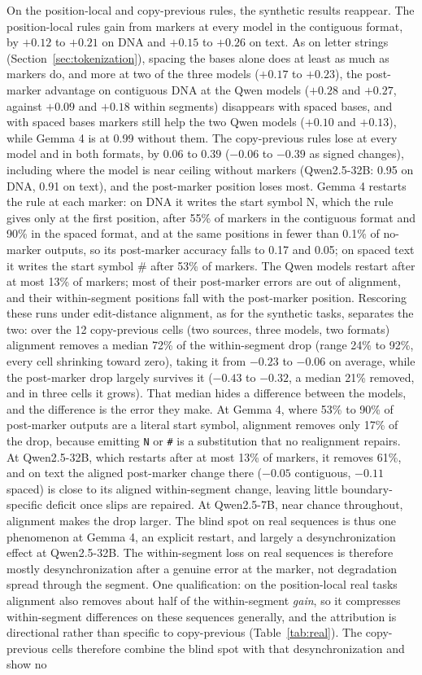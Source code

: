 \documentclass[10pt]{article} %
\begin{document}
On the position-local and copy-previous rules, the synthetic results reappear. The position-local rules gain from markers at every model in the contiguous format, by $+0.12$ to $+0.21$ on DNA and $+0.15$ to $+0.26$ on text. As on letter strings (Section~\ref{sec:tokenization}), spacing the bases alone does at least as much as markers do, and more at two of the three models ($+0.17$ to $+0.23$), the post-marker advantage on contiguous DNA at the Qwen models ($+0.28$ and $+0.27$, against $+0.09$ and $+0.18$ within segments) disappears with spaced bases, and with spaced bases markers still help the two Qwen models ($+0.10$ and $+0.13$), while Gemma 4 is at 0.99 without them. The copy-previous rules lose at every model and in both formats, by $0.06$ to $0.39$ ($-0.06$ to $-0.39$ as signed changes), including where the model is near ceiling without markers (Qwen2.5-32B: 0.95 on DNA, 0.91 on text), and the post-marker position loses most. Gemma 4 restarts the rule at each marker: on DNA it writes the start symbol N, which the rule gives only at the first position, after 55\% of markers in the contiguous format and 90\% in the spaced format, and at the same positions in fewer than 0.1\% of no-marker outputs, so its post-marker accuracy falls to 0.17 and 0.05; on spaced text it writes the start symbol \# after 53\% of markers. The Qwen models restart after at most 13\% of markers; most of their post-marker errors are out of alignment, and their within-segment positions fall with the post-marker position. Rescoring these runs under edit-distance alignment, as for the synthetic tasks, separates the two: over the 12 copy-previous cells (two sources, three models, two formats) alignment removes a median 72\% of the within-segment drop (range 24\% to 92\%, every cell shrinking toward zero), taking it from $-0.23$ to $-0.06$ on average, while the post-marker drop largely survives it ($-0.43$ to $-0.32$, a median 21\% removed, and in three cells it grows). That median hides a difference between the models, and the difference is the error they make. At Gemma 4, where 53\% to 90\% of post-marker outputs are a literal start symbol, alignment removes only 17\% of the drop, because emitting \texttt{N} or \texttt{\#} is a substitution that no realignment repairs. At Qwen2.5-32B, which restarts after at most 13\% of markers, it removes 61\%, and on text the aligned post-marker change there ($-0.05$ contiguous, $-0.11$ spaced) is close to its aligned within-segment change, leaving little boundary-specific deficit once slips are repaired. At Qwen2.5-7B, near chance throughout, alignment makes the drop larger. The blind spot on real sequences is thus one phenomenon at Gemma 4, an explicit restart, and largely a desynchronization effect at Qwen2.5-32B. The within-segment loss on real sequences is therefore mostly desynchronization after a genuine error at the marker, not degradation spread through the segment. One qualification: on the position-local real tasks alignment also removes about half of the within-segment \emph{gain}, so it compresses within-segment differences on these sequences generally, and the attribution is directional rather than specific to copy-previous (Table~\ref{tab:real}). The copy-previous cells therefore combine the blind spot with that desynchronization and show no 
\end{document}
